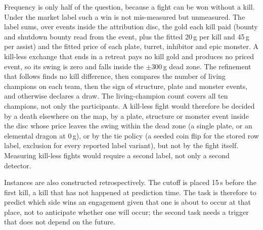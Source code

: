 Frequency is only half of the question, because a fight can be won without a kill. Under the
market label such a win is not mis-measured but unmeasured. The label sums, over events inside
the attribution disc, the gold each kill paid (bounty and shutdown bounty read from the event,
plus the fitted 20\,g per kill and 45\,g per assist) and the fitted price of each plate, turret,
inhibitor and epic monster.
A kill-less exchange that ends in a retreat pays no kill gold and produces no priced event, so its
swing is zero and falls inside the $\pm 300$\,g dead zone. The refinement that follows finds no kill
difference, then compares the number of living champions on each team, then the sign of
structure, plate and monster events, and otherwise declares a draw.
The living-champion count covers all ten champions, not only the participants. A kill-less fight
would therefore be decided by a death elsewhere on the map, by a plate, structure or monster event
inside the disc whose price leaves the swing within the dead zone (a single plate, or an elemental
dragon at 0\,g), or by the tie policy (a seeded coin flip for the stored row label, exclusion for
every reported label variant), but not by the fight itself.
Measuring kill-less fights would require a second label, not only a second detector.

Instances are also constructed retrospectively. The cutoff is placed 15\,s before the first
kill, a kill that has not happened at prediction time.
The task is therefore to predict which side wins an engagement given that one is about to
occur at that place, not to anticipate whether one will occur; the second task needs a trigger
that does not depend on the future.

